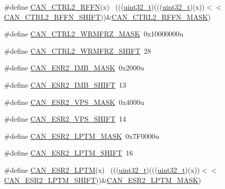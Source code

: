 \begin{DoxyCompactItemize}
\item 
\#define \hyperlink{group___c_a_n___register___masks_ga51f2e92ec3d4aed43f48ede13f13457b}{C\+A\+N\+\_\+\+C\+T\+R\+L2\+\_\+\+R\+F\+FN}(x)                                            ~(((\hyperlink{_p_e___types_8h_a33594304e786b158f3fb30289278f5af}{uint32\+\_\+t})(((\hyperlink{_p_e___types_8h_a33594304e786b158f3fb30289278f5af}{uint32\+\_\+t})(x))$<$$<$\hyperlink{group___c_a_n___register___masks_ga573803e007b6904ec3b8c5ab45acf33e}{C\+A\+N\+\_\+\+C\+T\+R\+L2\+\_\+\+R\+F\+F\+N\+\_\+\+S\+H\+I\+FT}))\&\hyperlink{group___c_a_n___register___masks_ga2cf8e472f27dccf6b1e9b9af80f76542}{C\+A\+N\+\_\+\+C\+T\+R\+L2\+\_\+\+R\+F\+F\+N\+\_\+\+M\+A\+SK})
\item 
\#define \hyperlink{group___c_a_n___register___masks_ga5f73e5da9fb12e711d2b23b7092788f2}{C\+A\+N\+\_\+\+C\+T\+R\+L2\+\_\+\+W\+R\+M\+F\+R\+Z\+\_\+\+M\+A\+SK}~0x10000000u
\item 
\#define \hyperlink{group___c_a_n___register___masks_ga1ada3c4c31b40ac2d1d0aa69b8beead7}{C\+A\+N\+\_\+\+C\+T\+R\+L2\+\_\+\+W\+R\+M\+F\+R\+Z\+\_\+\+S\+H\+I\+FT}~28
\item 
\#define \hyperlink{group___c_a_n___register___masks_ga8e8d269c3e59c20582dd8d0c5ea07daf}{C\+A\+N\+\_\+\+E\+S\+R2\+\_\+\+I\+M\+B\+\_\+\+M\+A\+SK}~0x2000u
\item 
\#define \hyperlink{group___c_a_n___register___masks_gac5b6c49733501a621096ab8226acafd0}{C\+A\+N\+\_\+\+E\+S\+R2\+\_\+\+I\+M\+B\+\_\+\+S\+H\+I\+FT}~13
\item 
\#define \hyperlink{group___c_a_n___register___masks_ga5fc376e62f61a97583edf7a54b8753be}{C\+A\+N\+\_\+\+E\+S\+R2\+\_\+\+V\+P\+S\+\_\+\+M\+A\+SK}~0x4000u
\item 
\#define \hyperlink{group___c_a_n___register___masks_ga7c22b4e9fdd8beae74e86b256db23665}{C\+A\+N\+\_\+\+E\+S\+R2\+\_\+\+V\+P\+S\+\_\+\+S\+H\+I\+FT}~14
\item 
\#define \hyperlink{group___c_a_n___register___masks_ga864e9e1cd2a2b0e354b284bd5488f29e}{C\+A\+N\+\_\+\+E\+S\+R2\+\_\+\+L\+P\+T\+M\+\_\+\+M\+A\+SK}~0x7\+F0000u
\item 
\#define \hyperlink{group___c_a_n___register___masks_gace1651295c821917bb5b37915baa3771}{C\+A\+N\+\_\+\+E\+S\+R2\+\_\+\+L\+P\+T\+M\+\_\+\+S\+H\+I\+FT}~16
\item 
\#define \hyperlink{group___c_a_n___register___masks_gaf5f092143c11fc809fc6a6108828bfe7}{C\+A\+N\+\_\+\+E\+S\+R2\+\_\+\+L\+P\+TM}(x)                                              ~(((\hyperlink{_p_e___types_8h_a33594304e786b158f3fb30289278f5af}{uint32\+\_\+t})(((\hyperlink{_p_e___types_8h_a33594304e786b158f3fb30289278f5af}{uint32\+\_\+t})(x))$<$$<$\hyperlink{group___c_a_n___register___masks_gace1651295c821917bb5b37915baa3771}{C\+A\+N\+\_\+\+E\+S\+R2\+\_\+\+L\+P\+T\+M\+\_\+\+S\+H\+I\+FT}))\&\hyperlink{group___c_a_n___register___masks_ga864e9e1cd2a2b0e354b284bd5488f29e}{C\+A\+N\+\_\+\+E\+S\+R2\+\_\+\+L\+P\+T\+M\+\_\+\+M\+A\+SK})

\end{DoxyCompactItemize}
